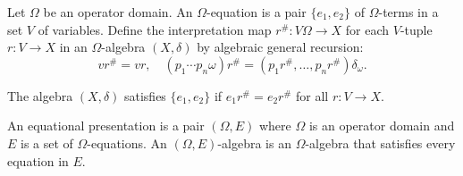 Let $\Omega$ be an operator domain. An $\Omega$-equation is a pair $\{e_1, e_2\}$ of $\Omega$-terms in a set $V$ of variables. Define the interpretation map $r^{\#}: V\Omega \longrightarrow X$ for each $V$-tuple $r: V \longrightarrow X$ in an $\Omega$-algebra $(X, \delta)$ by algebraic general recursion:
$$v r^{\#} = v r, \quad (p_1 \cdots p_n \omega) r^{\#} = (p_1 r^{\#}, \ldots, p_n r^{\#}) \delta_{\omega}.$$

The algebra $(X, \delta)$ satisfies $\{e_1, e_2\}$ if $e_1 r^{\#} = e_2 r^{\#}$ for all $r: V \longrightarrow X$.

An equational presentation is a pair $(\Omega, E)$ where $\Omega$ is an operator domain and $E$ is a set of $\Omega$-equations. An $(\Omega, E)$-algebra is an $\Omega$-algebra that satisfies every equation in $E$.
